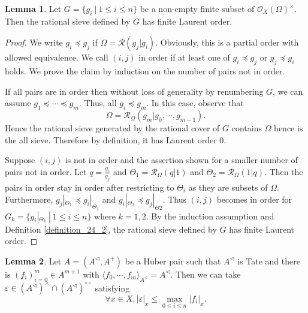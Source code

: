 \documentclass[10pt]{article}
\numberwithin{equation}{section}
\theoremstyle{definition}
\newtheorem{lemma}{Lemma}[subsection]
\newcommand{\cR}[0]{\mathcal{R}}
\newcommand{\sep}[0]{\:|\:}
\newcommand{\ab}[1]{\vert #1 \vert}
\newcommand{\cO}[0]{\mathcal{O}}
\newcommand{\dcirc}[0]{{\circ\circ}}
\begin{document}
\begin{lemma}
    \label{lemma_24_1}
    Let $G=\{g_i\sep 1\leq i\leq n\}$ be a non-empty finite subset of $\cO_X(\Omega)^\times$.
    Then the rational sieve defined by $G$ has finite Laurent order.
\end{lemma}
\begin{proof}
    We write $g_i\preceq g_j$ if $\Omega=\cR(g_j|g_i)$. Obviously, this is a partial order with allowed equivalence. We call $(i,j)$ in order if at least one of $g_i\preceq g_j$ or $g_j\preceq g_i$ holds.
    We prove the claim by induction on the number of pairs not in order.
    \par If all pairs are in order then without loss of generality by renumbering $G$, we can assume $g_1\preceq \cdots\preceq g_m$. Thus, all $g_i\preceq g_m$. In this case, observe that
    \begin{equation*}
    \Omega = \cR_\Omega(g_m|g_0,\cdots,g_{m-1}).
    \end{equation*}
    Hence the rational sieve generated by the rational cover of $G$ contains $\Omega$ hence is the all sieve. Therefore by definition, it has Laurent order $0$.
    \par Suppose $(i,j)$ is not in order and the assertion shown for a smaller number of pairs not in order. Let $q ={\frac {g_i} {g_j}}$ and $\Theta_1 = \cR_\Omega(q|1)$ and $\Theta_2=\cR_\Omega(1|q)$. Then the pairs in order stay in order after restricting to $\Theta_i$ as they are subsets of $\Omega$. Furthermore, $g_j|_{\Theta_1}\preceq g_i|_{\Theta_1}$ and $g_i|_{\Theta_2}\preceq g_j|_{\Theta2}$.
    Thus $(i,j)$ becomes in order for $G_k = \{g_i|_{\Theta_k}\sep 1\leq i\leq n\}$ where $k=1,2$. By the induction assumption and Definition \ref{definition_24_2}, the rational sieve defined by $G$ has finite Laurent order.
\end{proof}

\begin{lemma}
    \label{lemma_24_2}
    Let $A=(A^\triangleleft,A^+)$ be a Huber pair such that $A^\triangleleft$ is Tate and there is $(f_i)_{i=0}^m\in A^{m+1}$ with $\langle f_0,\cdots,f_m\rangle_{A^\triangleleft}=A^\triangleleft$. Then we can take $\varepsilon\in (A^{\triangleleft})^\times\cap (A^{\triangleleft})^\dcirc$ satisfying
    \begin{equation*}
        \forall x\in X,\ab{\varepsilon}_x \leq\max_{0\leq i\leq n}\ab{f_i}_x.\label{eq:lemma_24_2_3}
    \end{equation*}
\end{lemma}
\end{document}
